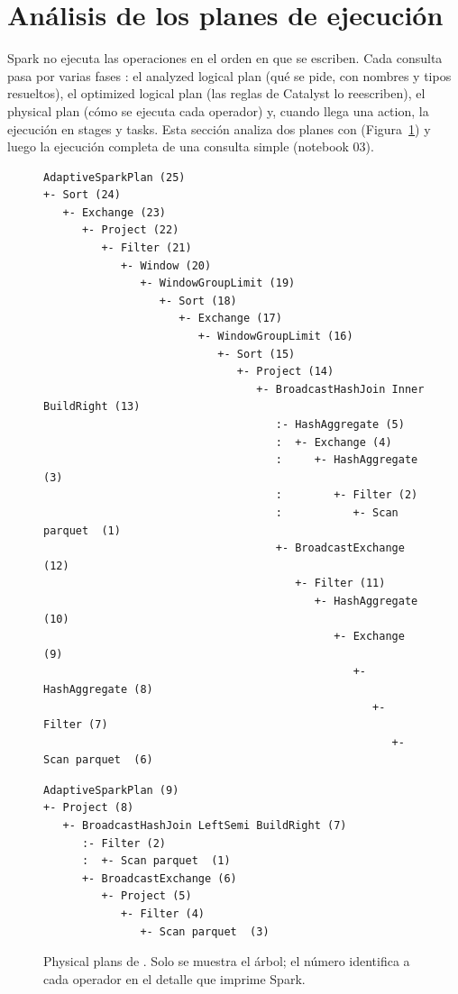 \section{Análisis de los planes de ejecución}
\label{sec:plans}

Spark no ejecuta las operaciones en el orden en que se escriben. Cada consulta pasa por varias fases
\cite{armbrust2015}: el analyzed logical plan (qué se pide, con nombres y tipos resueltos), el optimized logical
plan (las reglas de Catalyst lo reescriben), el physical plan (cómo se ejecuta cada operador) y, cuando llega una
action, la ejecución en stages y tasks. Esta sección analiza dos planes con 
(Figura~\ref{fig:plans}) y luego la ejecución completa de una consulta simple (notebook 03).

\begin{figure}[htbp]
\centering
\begin{minipage}[t]{0.585\textwidth}
\begin{lstlisting}[style=plan]
AdaptiveSparkPlan (25)
+- Sort (24)
   +- Exchange (23)
      +- Project (22)
         +- Filter (21)
            +- Window (20)
               +- WindowGroupLimit (19)
                  +- Sort (18)
                     +- Exchange (17)
                        +- WindowGroupLimit (16)
                           +- Sort (15)
                              +- Project (14)
                                 +- BroadcastHashJoin Inner BuildRight (13)
                                    :- HashAggregate (5)
                                    :  +- Exchange (4)
                                    :     +- HashAggregate (3)
                                    :        +- Filter (2)
                                    :           +- Scan parquet  (1)
                                    +- BroadcastExchange (12)
                                       +- Filter (11)
                                          +- HashAggregate (10)
                                             +- Exchange (9)
                                                +- HashAggregate (8)
                                                   +- Filter (7)
                                                      +- Scan parquet  (6)
\end{lstlisting}
\label{fig:plan1}
\end{minipage}\hfill
\begin{minipage}[t]{0.385\textwidth}
\begin{lstlisting}[style=plan]
AdaptiveSparkPlan (9)
+- Project (8)
   +- BroadcastHashJoin LeftSemi BuildRight (7)
      :- Filter (2)
      :  +- Scan parquet  (1)
      +- BroadcastExchange (6)
         +- Project (5)
            +- Filter (4)
               +- Scan parquet  (3)
\end{lstlisting}
\label{fig:plan2}
\end{minipage}
\caption{Physical plans de . Solo se muestra el árbol; el número identifica a cada
operador en el detalle que imprime Spark.}
\label{fig:plans}
\end{figure}


